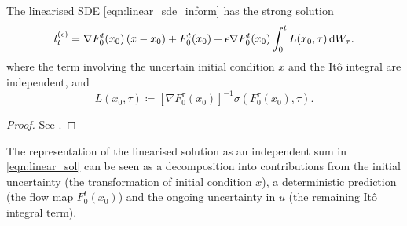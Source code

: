 \begin{theorem}\label{thm:limit_sol}
	The linearised SDE \cref{eqn:linear_sde_inform} has the strong solution
	\begin{equation}
		l_t^{(\epsilon)} = \nabla F_0^t\!\left(x_0\right)\left(x - x_0\right) + F_0^t\!\left(x_0\right) + \epsilon\nabla F_0^t\!\left(x_0\right)\int_0^t{L\!\left(x_0, \tau\right)\dif W_\tau}.
		\label{eqn:linear_sol}
	\end{equation}
	where the term involving the uncertain initial condition \(x\) and the It\^o integral are independent, and
	\begin{equation}
		L\!\left(x_0, \tau\right) \coloneqq \left[\nabla F_0^\tau(x_0)\right]^{-1}\sigma\left(F_0^\tau(x_0), \tau\right).
		\label{eqn:sigma_L_def}
	\end{equation}

\end{theorem}
\begin{proof}
	See .
\end{proof}

The representation of the linearised solution as an independent sum in \cref{eqn:linear_sol} can be seen as a decomposition into contributions from the initial uncertainty (the transformation of initial condition \(x\)), a deterministic prediction (the flow map \(F_0^t\!\left(x_0\right)\)) and the ongoing uncertainty in \(u\) (the remaining It\^o integral term).

